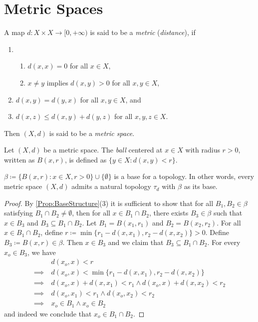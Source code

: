 \documentclass[screen,single]{techreport}
\numberwithin{equation}{section}
\begin{document}
\section{Metric Spaces}

\begin{definition}\label{De:Metrics}
	A map $d : X \times X \to [0,+\infty)$ is said to be a \emph{metric} (\emph{distance}), if
	\begin{enumerate}
		\item\
		\begin{enumerate}
			\item $d(x,x) = 0$ for all $x \in X$,
			\item $x \neq y$ implies $d(x,y) > 0$ for all $x,y \in X$,
		\end{enumerate}
		\item $d(x,y) = d(y,x)$ for all $x,y \in X$, and
		\item $d(x,z) \le d(x,y) + d(y,z)$ for all $x,y,z \in X$.
	\end{enumerate}
	Then $(X,d)$ is said to be a \emph{metric space}.
\end{definition}

\begin{definition}\label{De:OpenBalls}
	Let $(X,d)$ be a metric space.
	The \emph{ball} centered at $x \in X$ with radius $r > 0$, written as $B(x,r)$, is defined as $\{ y \in X : d(x,y) < r\}$.
\end{definition}

\begin{lemma}\label{Lem:MetricInduceTop}
	$\beta \coloneqq \{ B(x,r) : x \in X, r > 0 \} \cup \{ \emptyset \}$ is a base for a topology.
	In other words, every metric space $(X,d)$ admits a natural topology $\tau_d$ with $\beta$ as its base.
\end{lemma}
\begin{proof}
	By \cref{Prop:BaseStructure}(3) it is sufficient to show that for all $B_1,B_2 \in \beta$ satisfying $B_1 \cap B_2 \neq \emptyset$, then for all $x \in B_1 \cap B_2$, there exists $B_3 \in \beta$ such that $x \in B_3$ and $B_3 \subseteq B_1 \cap B_2$.
	Let $B_1 = B(x_1,r_1)$ and $B_2 = B(x_2,r_2)$.
	For all $x \in B_1 \cap B_2$, define $r \coloneqq \min \{ r_1 - d(x,x_1), r_2 - d(x,x_2) \} > 0$.
	Define $B_3 \coloneqq B(x,r) \in \beta$.
	Then $x \in B_3$ and we claim that $B_3 \subseteq B_1 \cap B_2$.
	For every $x_o \in B_3$, we have
	\begin{align*}
		& d(x_o,x) < r \\
		\implies~ & d(x_o,x) < \min \{ r_1 - d(x,x_1), r_2 - d(x,x_2) \} \\
		\implies~ & d(x_o,x) + d(x,x_1) < r_1 \wedge d(x_o,x)+d(x,x_2) < r_2 \\
		\implies~ & d(x_o,x_1) < r_1 \wedge d(x_o,x_2) < r_2 \\
		\implies~ & x_o \in B_1 \wedge x_o \in B_2
	\end{align*}
	and indeed we conclude that $x_o \in B_1 \cap B_2$.
\end{proof}
\end{document}
